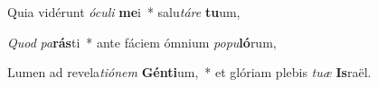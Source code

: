 \item Quia vidérunt \textit{ó}\textit{cu}\textit{li} \textbf{me}i~* salu\textit{tá}\textit{re} \textbf{tu}um,
\item \textit{Quod} \textit{pa}\textbf{rás}ti~* ante fáciem ómnium \textit{po}\textit{pu}\textbf{ló}rum,
\item Lumen ad revela\textit{ti}\textit{ó}\textit{nem} \textbf{Gén}\textbf{ti}um,~* et glóriam plebis \textit{tu}\textit{æ} \textbf{Is}raël.
